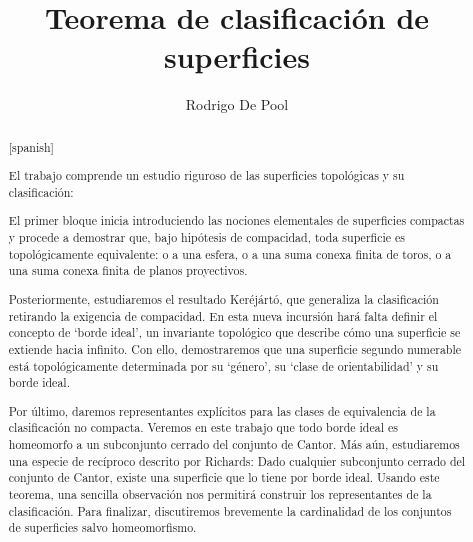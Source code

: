 \documentclass[a4paper,11pt,spanish, twoside, leqno]{tfg-uam}
\title{Teorema de clasificación de superficies}
\author{Rodrigo De Pool}
\theoremstyle{definition}
\begin{document}
\begin{abstract}[spanish]

El trabajo comprende un estudio riguroso de las superficies topológicas y su clasificación:

El primer bloque inicia introduciendo las nociones elementales de superficies compactas y procede a demostrar que, bajo hipótesis de compacidad, toda superficie es topológicamente equivalente: o a una esfera, o a una suma conexa finita de toros, o a una suma conexa finita de planos proyectivos. 

Posteriormente, estudiaremos el resultado Keréjártó, que generaliza la clasificación retirando la exigencia de compacidad. En esta nueva incursión hará falta definir el concepto de `borde ideal', un invariante topológico que describe cómo una superficie se extiende hacia infinito. Con ello, demostraremos que una superficie segundo numerable está topológicamente determinada por su `género', su `clase de orientabilidad' y su borde ideal. 

Por último, daremos representantes explícitos para las clases de equivalencia de la clasificación no compacta. Veremos en este trabajo que todo borde ideal es homeomorfo a un subconjunto cerrado del conjunto de Cantor. Más aún, estudiaremos una especie de recíproco descrito por Richards: Dado cualquier subconjunto cerrado del conjunto de Cantor, existe una superficie que lo tiene por borde ideal. Usando este teorema, una sencilla observación nos permitirá construir los representantes de la clasificación. Para finalizar, discutiremos brevemente la cardinalidad de los conjuntos de superficies salvo homeomorfismo.
\end{abstract}
\end{document}
